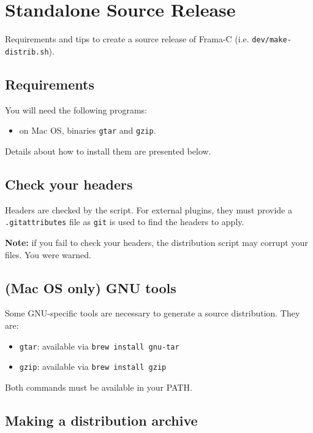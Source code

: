 \appendix

\chapter{Standalone Source Release}
\label{chap:make-src-distrib}

Requirements and tips to create a source release of Frama-C
(i.e. \texttt{dev/make-distrib.sh}).

\section{Requirements}

You will need the following programs:

\begin{itemize}
\item on Mac OS, binaries \texttt{gtar} and \texttt{gzip}.
\end{itemize}

Details about how to install them are presented below.

\section{Check your headers}

Headers are checked by the script. For external plugins, they must provide a
\texttt{.gitattributes} file as \texttt{git} is used to find the headers to
apply.

\textbf{Note:} if you fail to check your headers, the distribution script may
corrupt your files. You were warned.

\section{(Mac OS only) GNU tools}

Some GNU-specific tools are necessary to generate a source distribution. They
are:

\begin{itemize}
\item \texttt{gtar}: available via \texttt{brew install gnu-tar}
\item \texttt{gzip}: available via \texttt{brew install gzip}
\end{itemize}

Both commands must be available in your PATH.

\section{Making a distribution archive}

